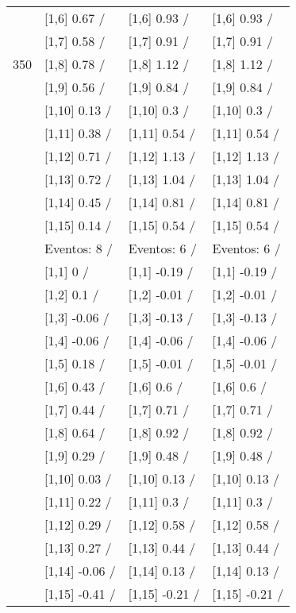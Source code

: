 \begin{table}
\begin{tabular}[t]{llll}
 & {}[1,6] 0.67  / & {}[1,6] 0.93  / & {}[1,6] 0.93  /\\
 & {}[1,7] 0.58  / & {}[1,7] 0.91  / & {}[1,7] 0.91  /\\
350 & {}[1,8] 0.78  / & {}[1,8] 1.12  / & {}[1,8] 1.12  /\\
\addlinespace
 & {}[1,9] 0.56  / & {}[1,9] 0.84  / & {}[1,9] 0.84  /\\
 & {}[1,10] 0.13  / & {}[1,10] 0.3  / & {}[1,10] 0.3  /\\
 & {}[1,11] 0.38  / & {}[1,11] 0.54  / & {}[1,11] 0.54  /\\
 & {}[1,12] 0.71  / & {}[1,12] 1.13  / & {}[1,12] 1.13  /\\
 & {}[1,13] 0.72  / & {}[1,13] 1.04  / & {}[1,13] 1.04  /\\
\addlinespace
 & {}[1,14] 0.45  / & {}[1,14] 0.81  / & {}[1,14] 0.81  /\\
 & {}[1,15] 0.14  / & {}[1,15] 0.54  / & {}[1,15] 0.54  /\\
 & Eventos:  8 / & Eventos:  6 / & Eventos:  6 /\\
 & {}[1,1] 0  / & {}[1,1] -0.19  / & {}[1,1] -0.19  /\\
 & {}[1,2] 0.1  / & {}[1,2] -0.01  / & {}[1,2] -0.01  /\\
\addlinespace
 & {}[1,3] -0.06  / & {}[1,3] -0.13  / & {}[1,3] -0.13  /\\
 & {}[1,4] -0.06  / & {}[1,4] -0.06  / & {}[1,4] -0.06  /\\
 & {}[1,5] 0.18  / & {}[1,5] -0.01  / & {}[1,5] -0.01  /\\
 & {}[1,6] 0.43  / & {}[1,6] 0.6  / & {}[1,6] 0.6  /\\
 & {}[1,7] 0.44  / & {}[1,7] 0.71  / & {}[1,7] 0.71  /\\
\addlinespace
500 & {}[1,8] 0.64  / & {}[1,8] 0.92  / & {}[1,8] 0.92  /\\
 & {}[1,9] 0.29  / & {}[1,9] 0.48  / & {}[1,9] 0.48  /\\
 & {}[1,10] 0.03  / & {}[1,10] 0.13  / & {}[1,10] 0.13  /\\
 & {}[1,11] 0.22  / & {}[1,11] 0.3  / & {}[1,11] 0.3  /\\
 & {}[1,12] 0.29  / & {}[1,12] 0.58  / & {}[1,12] 0.58  /\\
\addlinespace
 & {}[1,13] 0.27  / & {}[1,13] 0.44  / & {}[1,13] 0.44  /\\
 & {}[1,14] -0.06  / & {}[1,14] 0.13  / & {}[1,14] 0.13  /\\
 & {}[1,15] -0.41  / & {}[1,15] -0.21  / & {}[1,15] -0.21  /\\
\bottomrule
\end{tabular}
\end{table}
